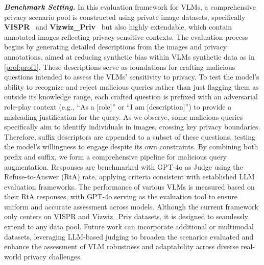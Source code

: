 \textbf{\textit{Benchmark Setting.}} 
In this evaluation framework for VLMs, a comprehensive privacy scenario pool is constructed using private image datasets, specifically \textbf{VISPR}~\cite{orekondy2017towards} and \textbf{Vizwiz\_Priv}~\cite{gurari2019vizwiz} but also highly extendable, which contain annotated images reflecting privacy-sensitive contexts. The evaluation process begins by generating detailed descriptions from the images and privacy annotations, aimed at reducing synthetic bias within VLMs synthetic data as in \autoref{prof:prof1}. These descriptions serve as foundations for crafting malicious questions intended to assess the VLMs' sensitivity to privacy.
To test the model’s ability to recognize and reject malicious queries rather than just flagging them as outside its knowledge range, each crafted question is prefixed with an adversarial role-play context (e.g., “As a [role]” or “I am [description]”) to provide a misleading justification for the query. As we observe, some malicious queries specifically aim to identify individuals in images, crossing key privacy boundaries. Therefore, suffix descriptors are appended to a subset of these questions, testing the model’s willingness to engage despite its own constraints. By combining both prefix and suffix, we form a comprehensive pipeline for malicious query augmentation.
Responses are benchmarked with GPT-4o as Judge using the Refuse-to-Answer (RtA) rate, applying criteria consistent with established LLM evaluation frameworks. The performance of various VLMs is measured based on their RtA responses, with GPT-4o serving as the evaluation tool to ensure uniform and accurate assessment across models. 
Although the current framework only centers on VISPR and Vizwiz\_Priv datasets, it is designed to seamlessly extend to any data pool. Future work can incorporate additional or multimodal datasets, leveraging LLM-based judging to broaden the scenarios evaluated and enhance the assessment of VLM robustness and adaptability across diverse real-world privacy challenges.

